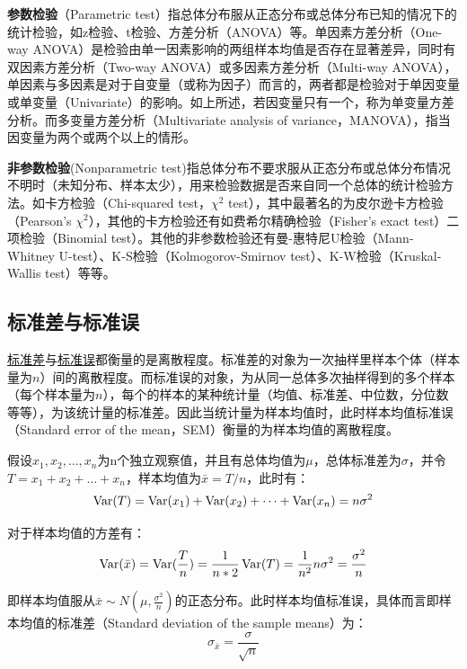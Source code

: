 \documentclass[11pt]{article}
\begin{document}
\textbf{参数检验}（Parametric test）指总体分布服从正态分布或总体分布已知的情况下的统计检验，如z检验、t检验、方差分析（ANOVA）等。单因素方差分析（One-way ANOVA）是检验由单一因素影响的两组样本均值是否存在显著差异，同时有双因素方差分析（Two-way ANOVA）或多因素方差分析（Multi-way ANOVA），单因素与多因素是对于自变量（或称为因子）而言的，两者都是检验对于单因变量或单变量（Univariate）的影响。如上所述，若因变量只有一个，称为单变量方差分析。而多变量方差分析（Multivariate analysis of variance，MANOVA），指当因变量为两个或两个以上的情形。

\textbf{非参数检验}(Nonparametric test)指总体分布不要求服从正态分布或总体分布情况不明时（未知分布、样本太少），用来检验数据是否来自同一个总体的统计检验方法。如卡方检验（Chi-squared test，$\chi^2$ test），其中最著名的为皮尔逊卡方检验（Pearson's $\chi^2$），其他的卡方检验还有如费希尔精确检验（Fisher's exact test）二项检验（Binomial test）。其他的非参数检验还有曼-惠特尼U检验（Mann-Whitney U-test）、K-S检验（Kolmogorov-Smirnov test）、K-W检验（Kruskal-Wallis test）等等。

\subsection{标准差与标准误}
    
\uline{标准差}与\uline{标准误}都衡量的是离散程度。标准差的对象为一次抽样里样本个体（样本量为$n$）间的离散程度。而标准误的对象，为从同一总体多次抽样得到的多个样本（每个样本量为$n$），每个的样本的某种统计量（均值、标准差、中位数，分位数等等），为该统计量的标准差。因此当统计量为样本均值时，此时样本均值标准误（Standard error of the mean，SEM）衡量的为样本均值的离散程度。
    
假设$x_1,x_2,\dots,x_n$为n个独立观察值，并且有总体均值为$\mu$，总体标准差为$\sigma$，并令$T = x_1 + x_2 + \dots + x_n$，样本均值为$\bar{x} = T/n$，此时有：
\begin{equation*}
    \operatorname{Var}(T) = \operatorname{Var}(x_1) + \operatorname{Var}(x_2) + \dots + \operatorname{Var}(x_n) = n \sigma^2
\end{equation*}
    
对于样本均值的方差有：
\begin{equation*}
    \operatorname{Var}(\bar{x}) = \operatorname{Var}(\frac{T}{n}) = \frac{1}{n*2} \operatorname{Var}(T) = \frac{1}{n^2} n\sigma^2 = \frac{\sigma^2}{n}
\end{equation*}

即样本均值服从$\bar{x}\sim N(\mu,\frac{\sigma^2}{n})$的正态分布。此时样本均值标准误，具体而言即样本均值的标准差（Standard deviation of the sample means）为：
\begin{equation*}
    \sigma_{\bar{x}} = \frac{\sigma}{\sqrt{n}}
\end{equation*}
\end{document}
